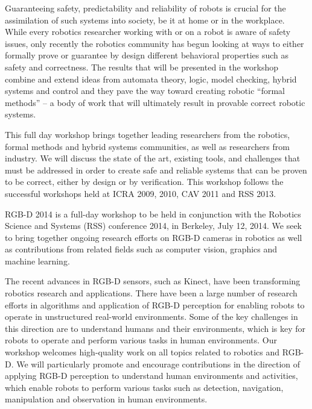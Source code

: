 \begin{spacing}{1.0}
{Guaranteeing safety, predictability and reliability of robots is crucial for the assimilation of such systems into society, be it at home or in the workplace. While every robotics researcher working with or on a robot is aware of safety issues, only recently the robotics community has begun looking at ways to either formally prove or guarantee by design different behavioral properties such as safety and correctness. The results that will be presented in the workshop combine and extend ideas from automata theory, logic, model checking, hybrid systems and control and they pave the way toward creating robotic “formal methods” – a body of work that will ultimately result in provable correct robotic systems.


This full day workshop brings together leading researchers from the robotics, formal methods and hybrid systems communities, as well as researchers from industry. We will discuss the state of the art, existing tools, and challenges that must be addressed in order to create safe and reliable systems that can be proven to be correct, either by design or by verification. This workshop follows the successful workshops held at ICRA 2009, 2010, CAV 2011 and RSS 2013.
}

{
RGB-D 2014 is a full-day workshop to be held in conjunction with the Robotics Science and Systems (RSS) conference 2014, in Berkeley, July 12, 2014. We seek to bring together ongoing research efforts on RGB-D cameras in robotics as well as contributions from related fields such as computer vision, graphics and machine learning.

The recent advances in RGB-D sensors, such as Kinect, have been transforming robotics research and applications. There have been a large number of research efforts in algorithms and application of RGB-D perception for enabling robots to operate in unstructured real-world environments. Some of the key challenges in this direction are to understand humans and their environments, which is key for robots to operate and perform various tasks in human environments. Our workshop welcomes high-quality work on all topics related to robotics and RGB-D. We will particularly promote and encourage contributions in the direction of applying RGB-D perception to understand human environments and activities, which enable robots to perform various tasks such as detection, navigation, manipulation and observation in human environments.


}
\end{spacing}

